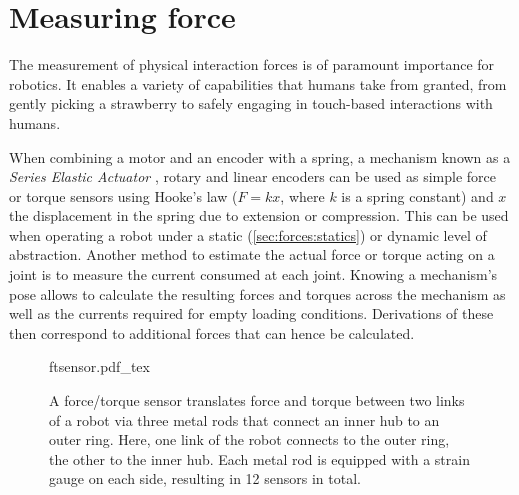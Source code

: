 \section{Measuring force}
The measurement of physical interaction forces is of paramount importance for robotics.
It enables a variety of capabilities that humans take from granted, from gently picking a strawberry to safely engaging in touch-based interactions with humans.

When combining a motor and an encoder with a spring, a mechanism known as  a \textsl{Series Elastic Actuator} \cite{pratt1995series} , rotary and linear encoders can be used as simple force or torque sensors using Hooke's law ($F=kx$, where $k$ is a spring constant) and $x$ the displacement in the spring due to extension or compression.
This can be used when operating a robot under a static (\cref{sec:forces:statics}) or dynamic level of abstraction.
Another method to estimate the actual force or torque acting on a joint is to measure the current consumed at each joint. Knowing a mechanism's pose allows to calculate the resulting forces and torques across the mechanism as well as the currents required for empty loading conditions. Derivations of these then correspond to additional forces that can hence be calculated.


\begin{figure}
	\centering
	\def\svgwidth{0.9\textwidth}
    {ftsensor.pdf_tex}
	\caption{A force/torque sensor translates force and torque between two links of a robot via three metal rods that connect an inner hub to an outer ring. Here, one link of the robot connects to the outer ring, the other to the inner hub.  Each metal rod is equipped with a strain gauge on each side, resulting in 12 sensors in total. 
	\label{fig:ftsensor}}
\end{figure}


